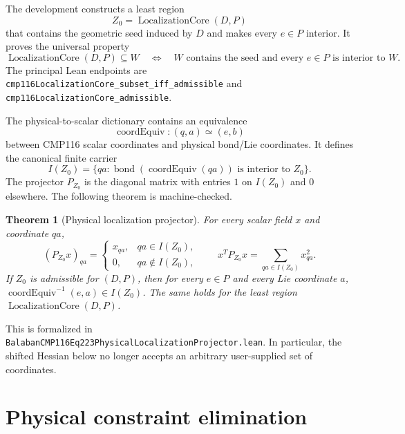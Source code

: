 \documentclass[11pt,a4paper]{article}
\newtheorem{theorem}{Theorem}[section]
\theoremstyle{definition}
\newcommand{\lean}[1]{\texttt{#1}}
\begin{document}
The development constructs a least region
\[
  Z_0=\operatorname{LocalizationCore}(D,P)
\]
that contains the geometric seed induced by $D$ and makes every $e\in P$
interior.  It proves the universal property
\begin{equation}\label{eq:minimal}
 \operatorname{LocalizationCore}(D,P)\subseteq W
 \quad\Longleftrightarrow\quad
 W\text{ contains the seed and every }e\in P\text{ is interior to }W.
\end{equation}
The principal Lean endpoints are
\lean{cmp116LocalizationCore\_subset\_iff\_admissible} and
\lean{cmp116LocalizationCore\_admissible}.

The physical-to-scalar dictionary contains an equivalence
\[
 \operatorname{coordEquiv}: (q,a)\simeq(e,b)
\]
between CMP116 scalar coordinates and physical bond/Lie coordinates.  It
defines the canonical finite carrier
\begin{equation}\label{eq:carrier}
 I(Z_0)=\{qa:\operatorname{bond}(\operatorname{coordEquiv}(qa))
                  \text{ is interior to }Z_0\}.
\end{equation}
The projector $P_{Z_0}$ is the diagonal matrix with entries $1$ on $I(Z_0)$
and $0$ elsewhere.  The following theorem is machine-checked.

\begin{theorem}[Physical localization projector]\label{thm:projector}
For every scalar field $x$ and coordinate $qa$,
\[
 (P_{Z_0}x)_{qa}=\begin{cases}
 x_{qa},&qa\in I(Z_0),\\
 0,&qa\notin I(Z_0),
 \end{cases}
 \qquad
 x^TP_{Z_0}x=\sum_{qa\in I(Z_0)}x_{qa}^2.
\]
If $Z_0$ is admissible for $(D,P)$, then for every $e\in P$ and every Lie
coordinate $a$, $\operatorname{coordEquiv}^{-1}(e,a)\in I(Z_0)$.  The same
holds for the least region $\operatorname{LocalizationCore}(D,P)$.
\end{theorem}

This is formalized in
\lean{BalabanCMP116Eq223PhysicalLocalizationProjector.lean}.  In particular,
the shifted Hessian below no longer accepts an arbitrary user-supplied set of
coordinates.

\section{Physical constraint elimination}
\end{document}
